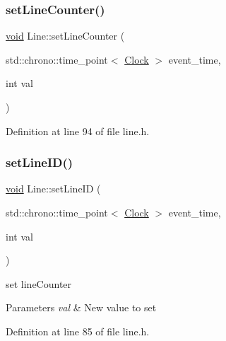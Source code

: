 \subsubsection{\texorpdfstring{set\+Line\+Counter()}{setLineCounter()}}
{\footnotesize\ttfamily \mbox{\hyperlink{glad_8h_a950fc91edb4504f62f1c577bf4727c29}{void}} Line\+::set\+Line\+Counter (\begin{DoxyParamCaption}\item[{std\+::chrono\+::time\+\_\+point$<$ \mbox{\hyperlink{universe_8h_a0ef8d951d1ca5ab3cfaf7ab4c7a6fd80}{Clock}} $>$}]{event\+\_\+time,  }\item[{int}]{val }\end{DoxyParamCaption})\hspace{0.3cm}{\ttfamily [inline]}}



Definition at line 94 of file line.\+h.

\mbox{\label{class_line_aaa634bf320b9d1c4becb4083cd8324d4}} 
\subsubsection{\texorpdfstring{set\+Line\+I\+D()}{setLineID()}}
{\footnotesize\ttfamily \mbox{\hyperlink{glad_8h_a950fc91edb4504f62f1c577bf4727c29}{void}} Line\+::set\+Line\+ID (\begin{DoxyParamCaption}\item[{std\+::chrono\+::time\+\_\+point$<$ \mbox{\hyperlink{universe_8h_a0ef8d951d1ca5ab3cfaf7ab4c7a6fd80}{Clock}} $>$}]{event\+\_\+time,  }\item[{int}]{val }\end{DoxyParamCaption})\hspace{0.3cm}{\ttfamily [inline]}}

set line\+Counter 
\begin{DoxyParams}{Parameters}
{\em val} & New value to set \\
\hline
\end{DoxyParams}


Definition at line 85 of file line.\+h.

\mbox{\label{class_line_a7c315c5ffdd4fa875918583738e2e157}} 
